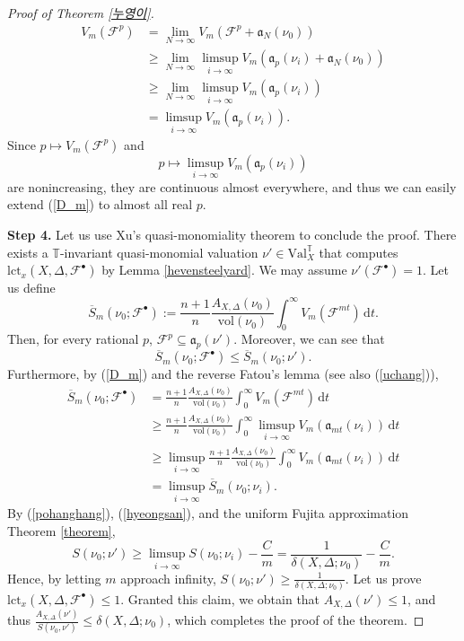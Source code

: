 \documentclass[a4paper,12pt]{amsart}
\theoremstyle{definition} %
\theoremstyle{remark}
\numberwithin{equation}{section}
\begin{document}
\begin{proof}[Proof of Theorem \ref{누영이}]
\begin{equation}
\begin{aligned}V_m(\mathcal{F}^p)&=\lim_{N\to \infty}V_m(\mathcal{F}^p+\mathfrak{a}_N(\nu_0))
\\ &\ge \lim_{N\to \infty}\limsup_{i\to \infty}V_m(\mathfrak{a}_{p}(\nu_i)+\mathfrak{a}_N(\nu_0))
\\ &\ge \lim_{N\to \infty}\limsup_{i\to \infty}V_m(\mathfrak{a}_{p}(\nu_i))
\\ &=\limsup_{i\to \infty}V_m(\mathfrak{a}_{p}(\nu_i)).
\end{aligned}
\end{equation}
Since $p\mapsto V_m(\mathcal{F}^p)$ and
$$ p\mapsto \limsup_{i\to \infty}V_m(\mathfrak{a}_{p}(\nu_i)) $$
are nonincreasing, they are continuous almost everywhere, and thus we can easily extend (\ref{D_m}) to almost all real $p$. 

\smallskip

\noindent \textbf{Step 4.} Let us use Xu's quasi-monomiality theorem to conclude the proof. There exists a $\mathbb{T}$-invariant quasi-monomial valuation $\nu'\in \mathrm{Val}^{\mathbb{T}}_X$ that computes $\mathrm{lct}_x(X,\Delta,\mathcal{F}^{\bullet})$ by Lemma \ref{hevensteelyard}. We may assume $\nu'(\mathcal{F}^{\bullet})=1$. Let us define
$$ \overline{S}_m(\nu_0;\mathcal{F}^\bullet):=\frac{n+1}{n}\frac{A_{X,\Delta}(\nu_0)}{\mathrm{vol}(\nu_0)}\int^{\infty}_{0}
V_m(\mathcal{F}^{mt})\,\mathrm{d}t
.$$
Then, for every rational $p$, $\mathcal{F}^p\subseteq \mathfrak{a}_p(\nu')$. Moreover, we can see that
\begin{equation} \label{pohanghang}
\overline{S}_m(\nu_0;\mathcal{F}^{\bullet})\le \overline{S}_m(\nu_0;\nu').
\end{equation}
Furthermore, by (\ref{D_m}) and the reverse Fatou's lemma (see also (\ref{uchang})),
\begin{equation} \label{hyeongsan}
\begin{aligned}
\overline{S}_m(\nu_0;\mathcal{F}^{\bullet})&=\frac{n+1}{n}\frac{A_{X,\Delta}(\nu_0)}{\mathrm{vol}(\nu_0)}\int^{\infty}_{0}V_m(\mathcal{F}^{mt})\,\mathrm{d}t
\\ &\ge \frac{n+1}{n}\frac{A_{X,\Delta}(\nu_0)}{\mathrm{vol}(\nu_0)}\int^{\infty}_{0}\limsup_{i\to \infty}V_m(\mathfrak{a}_{mt}(\nu_i))\,\mathrm{d}t
\\ &\ge \limsup_{i\to \infty}\frac{n+1}{n}\frac{A_{X,\Delta}(\nu_0)}{\mathrm{vol}(\nu_0)}\int^{\infty}_0V_m(\mathfrak{a}_{mt}(\nu_i))\,\mathrm{d}t
\\ &=\limsup_{i\to \infty} \overline{S}_m(\nu_0;\nu_i).
\end{aligned}
\end{equation}
By (\ref{pohanghang}), (\ref{hyeongsan}), and the uniform Fujita approximation Theorem \ref{theorem},
$$ S(\nu_0;\nu')\ge \limsup_{i\to \infty} S(\nu_0;\nu_i)-\frac{C}{m}=\frac{1}{\delta(X,\Delta;\nu_0)}-\frac{C}{m}.$$
Hence, by letting $m$ approach infinity, $S(\nu_0;\nu')\ge \frac{1}{\delta(X,\Delta;\nu_0)}$. Let us prove $\mathrm{lct}_x(X,\Delta,\mathcal{F}^{\bullet})\le 1$. Granted this claim, we obtain that $A_{X,\Delta}(\nu')\le 1$, and thus $\frac{A_{X,\Delta}(\nu')}{S(\nu_0,\nu')}\le \delta(X,\Delta;\nu_0)$, which completes the proof of the theorem.


\end{proof}
\end{document}
